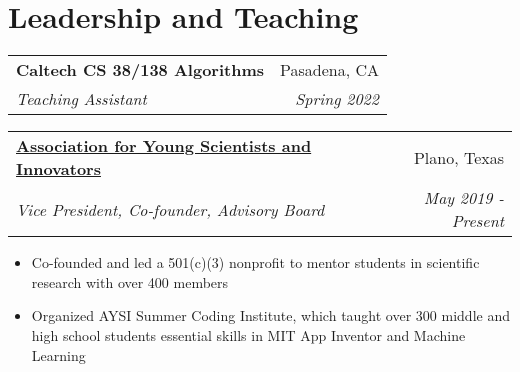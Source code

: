 \documentclass[letterpaper,11pt]{article}
\makeatletter
\newcommand{\resitem}[1]{\item[--] #1}
\newcommand{\ressubheading}[4]{
	\begin{tabular*}{7.5in}{l@{\extracolsep{\fill}}r}
			\textbf{#1} & #2 \\
			\textit{#3} & \textit{#4}
	\end{tabular*}
}
\makeatother
\begin{document}



\section{Leadership and Teaching}
\ressubheading{Caltech CS 38/138 Algorithms}{Pasadena, CA}{Teaching Assistant}{Spring 2022}

\ressubheading{\href{https://www.aysi.org}{Association for Young Scientists and Innovators}}{Plano, Texas}{Vice President, Co-founder, Advisory Board}{May 2019 - Present}
\begin{itemize}[leftmargin=*]
	\resitem{Co-founded and led a 501(c)(3) nonprofit to mentor students in scientific research with over 400 members}
	\resitem{Organized AYSI Summer Coding Institute, which taught over 300 middle and high school students essential skills in MIT App Inventor and Machine Learning}
\end{itemize}

\end{document}
